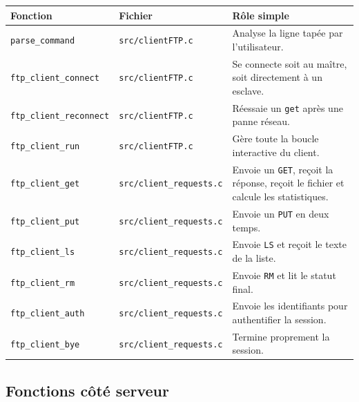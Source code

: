\documentclass[a4paper,11pt]{article}
\newcommand{\codecell}[1]{{\footnotesize\nolinkurl{#1}}}
\begin{document}
\begin{center}
\small
\begin{tabularx}{\textwidth}{@{}L{0.26\textwidth}L{0.22\textwidth}L{0.44\textwidth}@{}}
\toprule
\textbf{Fonction} & \textbf{Fichier} & \textbf{Rôle simple} \\
\midrule
\codecell{parse_command} & \codecell{src/clientFTP.c} & Analyse la ligne tapée par l'utilisateur. \\
\codecell{ftp_client_connect} & \codecell{src/clientFTP.c} & Se connecte soit au maître, soit directement à un esclave. \\
\codecell{ftp_client_reconnect} & \codecell{src/clientFTP.c} & Réessaie un \texttt{get} après une panne réseau. \\
\codecell{ftp_client_run} & \codecell{src/clientFTP.c} & Gère toute la boucle interactive du client. \\
\codecell{ftp_client_get} & \codecell{src/client_requests.c} & Envoie un \texttt{GET}, reçoit la réponse, reçoit le fichier et calcule les statistiques. \\
\codecell{ftp_client_put} & \codecell{src/client_requests.c} & Envoie un \texttt{PUT} en deux temps. \\
\codecell{ftp_client_ls} & \codecell{src/client_requests.c} & Envoie \texttt{LS} et reçoit le texte de la liste. \\
\codecell{ftp_client_rm} & \codecell{src/client_requests.c} & Envoie \texttt{RM} et lit le statut final. \\
\codecell{ftp_client_auth} & \codecell{src/client_requests.c} & Envoie les identifiants pour authentifier la session. \\
\codecell{ftp_client_bye} & \codecell{src/client_requests.c} & Termine proprement la session. \\
\bottomrule
\end{tabularx}
\end{center}

\subsection{Fonctions côté serveur}
\end{document}
